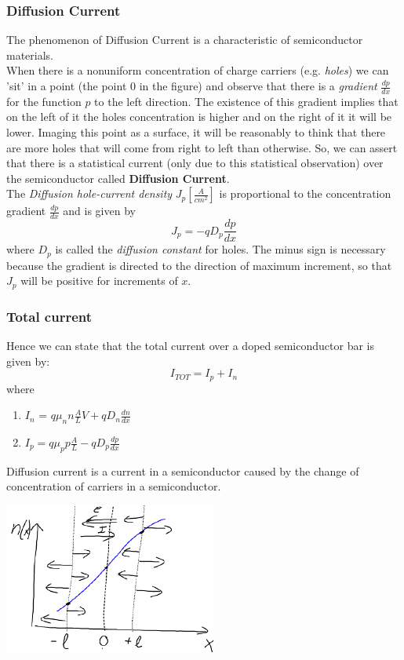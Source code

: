 \documentclass[12pt]{article}
\newcommand{\B}{\textbf}
\newcommand{\I}{\textit}
\begin{document}
\subsubsection{Diffusion Current} 
The phenomenon of Diffusion Current is a characteristic of semiconductor materials. \\
When there is a nonuniform concentration of charge carriers (e.g. \I{holes}) we can 'sit' in a point (the point 0 in the figure) and observe that there is a \I{gradient} $\frac{dp}{dx}$ for the function $p$ to the left direction. The existence of this gradient implies that on the left of it the holes concentration is higher and on the right of it it will be lower. Imaging this point as a surface, it will be reasonably to think that there are more holes that will come from right to left than otherwise. So, we can assert that there is a statistical current (only due to this statistical observation) over the semiconductor called \B{Diffusion Current}. \\
The \I{Diffusion hole-current density} $J_p [\frac{A}{cm^2}]$ is proportional to the concentration gradient $\frac{dp}{dx}$ and is given by
\begin{equation}
	J_p = -qD_p\frac{dp}{dx}
\end{equation}
where $D_p$ is called the \I{diffusion constant} for holes. The minus sign is necessary because the gradient is directed to the direction of maximum increment, so that $J_p$ will be positive for increments of $x$. 
\subsubsection{Total current}
Hence we can state that the total current over a doped semiconductor bar is given by:
\begin{equation}
	I_{TOT} = I_p + I_n	
\end{equation}
where 
\begin{enumerate}
	\item $I_n$ = $q \mu_nn \frac{A}{L} V + q D_n \frac{dn}{dx}$
	\item $I_p = q \mu_pp \frac{A}{L} - q D_p \frac{dp}{dx}$
\end{enumerate}


Diffusion current is a current in a semiconductor caused by the change of concentration of carriers in a semiconductor. \\
\begin{center}
	\includegraphics[width=7cm]{diffusion}
\end{center}
\end{document}
